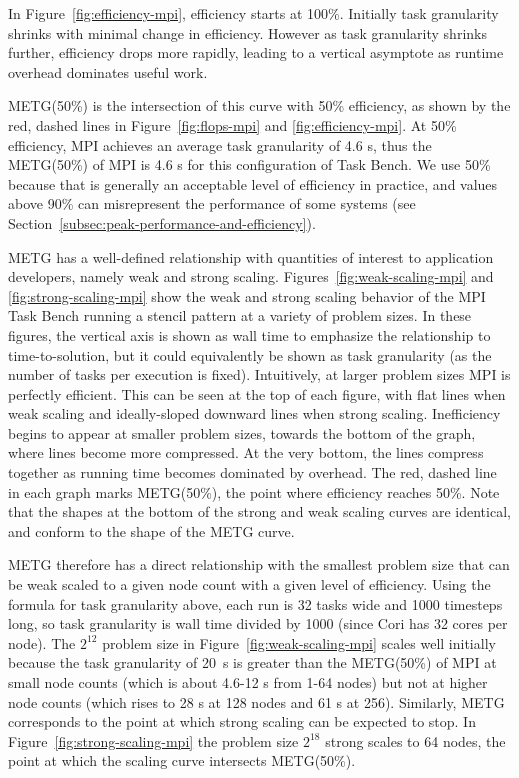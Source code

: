 In Figure~\ref{fig:efficiency-mpi},
efficiency starts at 100\%. Initially task granularity
shrinks with minimal change in efficiency. However as task
granularity shrinks further, efficiency drops more rapidly, leading
to a vertical asymptote as runtime overhead dominates useful work.


METG(50\%) is the intersection of this curve with 50\% efficiency, as
shown by the red, dashed lines in Figure~\ref{fig:flops-mpi} and
\ref{fig:efficiency-mpi}. At 50\% efficiency, MPI achieves an average
task granularity of
4.6 \textmu{}s, thus the METG(50\%) of MPI is 4.6 \textmu{}s for this configuration of
Task Bench. We use 50\% because that is generally an acceptable level
of efficiency in practice, and values above 90\% can misrepresent the
performance of some systems (see
Section~\ref{subsec:peak-performance-and-efficiency}).




METG has a well-defined
relationship with quantities of interest to application developers,
namely weak and strong scaling. Figures~\ref{fig:weak-scaling-mpi} and
\ref{fig:strong-scaling-mpi} show the weak and strong scaling behavior of the MPI Task Bench running a stencil pattern at a variety of problem sizes. In these
figures, the vertical axis is shown as wall time to emphasize the
relationship to time-to-solution, but it could equivalently be shown
as task granularity (as the number of tasks per execution is
fixed). Intuitively, at
larger problem sizes MPI is perfectly efficient. This can be seen at
the top of each figure, with flat lines when weak scaling and
ideally-sloped downward lines when strong scaling. Inefficiency begins
to appear at smaller problem sizes, towards the bottom of the graph,
where lines become more compressed. At the
very bottom, the lines compress together as running time becomes
dominated by overhead. The red, dashed line in each graph marks
METG(50\%), the point where efficiency reaches 50\%. Note that the
shapes at the bottom of the strong and weak scaling curves are identical,
and conform to the shape of the METG curve.

METG therefore has a direct relationship with the smallest problem
size that can be weak scaled to a given node count with a given level
of efficiency. Using the formula for task granularity above, each run
is 32 tasks wide and 1000 timesteps long, so task granularity is wall
time divided by 1000 (since Cori has 32 cores per node). The $2^{12}$
problem size in Figure~\ref{fig:weak-scaling-mpi} scales well
initially because the task granularity of 20~\textmu{}s is greater
than the METG(50\%) of MPI at small node counts (which is about 4.6-12
\textmu{}s from 1-64 nodes) but not at higher node counts (which rises
to 28 \textmu{}s at 128 nodes and 61 \textmu{}s at 256). Similarly,
METG corresponds to the point at which strong scaling can be expected
to stop. In Figure~\ref{fig:strong-scaling-mpi} the problem size
$2^{18}$ strong scales to 64 nodes, the point at which the
scaling curve intersects METG(50\%).

